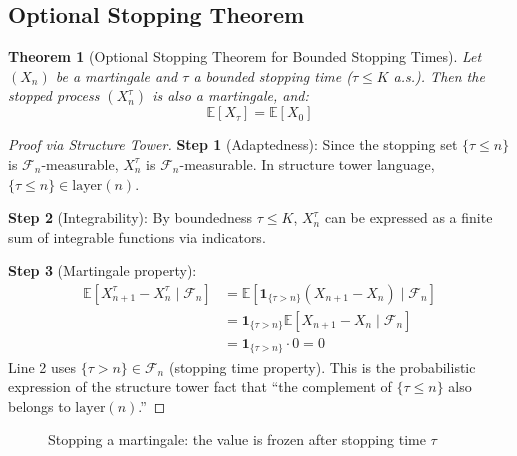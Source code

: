 \documentclass[11pt,a4paper]{article}
\theoremstyle{plain}
\newtheorem{theorem}{Theorem}[section]
\theoremstyle{definition}
\newcommand{\FF}{\mathcal{F}}
\newcommand{\EE}{\mathbb{E}}
\newcommand{\layer}{\mathrm{layer}}
\begin{document}
\subsection{Optional Stopping Theorem}

\begin{theorem}[Optional Stopping Theorem for Bounded Stopping Times]
\label{thm:optional-stopping}
Let $(X_n)$ be a martingale and $\tau$ a bounded stopping time ($\tau \leq K$ a.s.).
Then the stopped process $(X^\tau_n)$ is also a martingale, and:
\[
  \EE[X_\tau] = \EE[X_0]
\]
\end{theorem}

\begin{proof}[Proof via Structure Tower]
\textbf{Step 1} (Adaptedness):
Since the stopping set $\{\tau \leq n\}$ is $\FF_n$-measurable,
$X^\tau_n$ is $\FF_n$-measurable.
In structure tower language, $\{\tau \leq n\} \in \layer(n)$.

\textbf{Step 2} (Integrability):
By boundedness $\tau \leq K$, $X^\tau_n$ can be expressed as a 
finite sum of integrable functions via indicators.

\textbf{Step 3} (Martingale property):
\begin{align*}
  \EE[X^\tau_{n+1} - X^\tau_n \mid \FF_n] 
  &= \EE[\mathbf{1}_{\{\tau > n\}}(X_{n+1} - X_n) \mid \FF_n] \\
  &= \mathbf{1}_{\{\tau > n\}} \EE[X_{n+1} - X_n \mid \FF_n] \\
  &= \mathbf{1}_{\{\tau > n\}} \cdot 0 = 0
\end{align*}
Line 2 uses $\{\tau > n\} \in \FF_n$ (stopping time property).
This is the probabilistic expression of the structure tower fact that
``the complement of $\{\tau \leq n\}$ also belongs to $\layer(n)$.''
\end{proof}

\begin{figure}[htbp]
\centering
{}
\caption{Stopping a martingale: the value is frozen after stopping time $\tau$}
\label{fig:stopped-martingale}
\end{figure}
\end{document}
